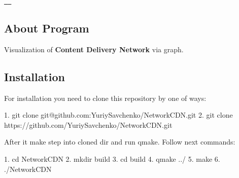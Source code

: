 \href{https://github.com/YuriySavchenko/NetworkCDN/releases}{\texttt{ }} \href{https://www.gnu.org/licenses/gpl-3.0}{\texttt{ }}

\subsection*{About Program}

Visualization of {\bfseries{Content Delivery Network}} via graph.

\subsection*{Installation}

For installation you need to clone this repository by one of ways\+: \begin{DoxyVerb}1. git clone git@github.com:YuriySavchenko/NetworkCDN.git
2. git clone https://github.com/YuriySavchenko/NetworkCDN.git
\end{DoxyVerb}


After it make step into cloned dir and run qmake. Follow next commands\+: \begin{DoxyVerb}1. cd NetworkCDN
2. mkdir build
3. cd build
4. qmake ../
5. make
6. ./NetworkCDN
\end{DoxyVerb}
 